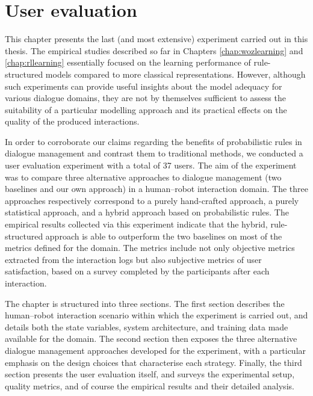 
\chapter{User evaluation}
\label{chap:user-evaluation}

This chapter presents the last (and most extensive) experiment carried out in this thesis. The empirical studies described so far in Chapters \ref{chap:wozlearning} and \ref{chap:rllearning} essentially focused on the learning performance of rule-structured models compared to more classical representations. However, although such experiments can provide useful insights about the model adequacy for various dialogue domains, they are not by themselves sufficient to assess the suitability of a particular modelling approach and its practical effects on the quality of the produced interactions. 

In order to corroborate our claims regarding the benefits of probabilistic rules in dialogue management and contrast them to traditional methods, we conducted a user evaluation experiment with a total of 37 users. The aim of the experiment was to compare three alternative approaches to dialogue management (two baselines and our own approach) in a human--robot interaction domain.  The three approaches respectively correspond to a purely hand-crafted approach, a purely statistical approach, and a hybrid approach based on probabilistic rules. The empirical results collected via this experiment indicate that the  hybrid, rule-structured approach is able to outperform the two baselines on most of the metrics defined for the domain.  The metrics include not only objective metrics extracted from the interaction logs but also subjective metrics of user satisfaction, based on a survey completed by the participants after each interaction. 

The chapter is structured into three sections.  The first section describes the human--robot interaction scenario within which the experiment is carried out, and details both the state variables, system architecture, and training data made available for the domain. The second section then exposes the three alternative dialogue management approaches developed for the experiment, with a particular emphasis on the design choices that characterise each strategy.   Finally, the third section presents the user evaluation itself, and surveys the experimental setup, quality metrics, and of course the empirical results and their detailed analysis. 

